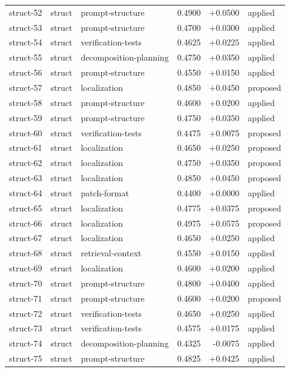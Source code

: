 \begin{center}
\begin{longtable}{llp{5.2cm}rrl}
struct-52 & struct & prompt-structure & 0.4900 & +0.0500 & applied \\
struct-53 & struct & prompt-structure & 0.4700 & +0.0300 & applied \\
struct-54 & struct & verification-tests & 0.4625 & +0.0225 & applied \\
struct-55 & struct & decomposition-planning & 0.4750 & +0.0350 & applied \\
struct-56 & struct & prompt-structure & 0.4550 & +0.0150 & applied \\
struct-57 & struct & localization & 0.4850 & +0.0450 & proposed \\
struct-58 & struct & prompt-structure & 0.4600 & +0.0200 & applied \\
struct-59 & struct & prompt-structure & 0.4750 & +0.0350 & applied \\
struct-60 & struct & verification-tests & 0.4475 & +0.0075 & proposed \\
struct-61 & struct & localization & 0.4650 & +0.0250 & proposed \\
struct-62 & struct & localization & 0.4750 & +0.0350 & proposed \\
struct-63 & struct & localization & 0.4850 & +0.0450 & proposed \\
struct-64 & struct & patch-format & 0.4400 & +0.0000 & applied \\
struct-65 & struct & localization & 0.4775 & +0.0375 & proposed \\
struct-66 & struct & localization & 0.4975 & +0.0575 & proposed \\
struct-67 & struct & localization & 0.4650 & +0.0250 & applied \\
struct-68 & struct & retrieval-context & 0.4550 & +0.0150 & applied \\
struct-69 & struct & localization & 0.4600 & +0.0200 & applied \\
struct-70 & struct & prompt-structure & 0.4800 & +0.0400 & applied \\
struct-71 & struct & prompt-structure & 0.4600 & +0.0200 & proposed \\
struct-72 & struct & verification-tests & 0.4650 & +0.0250 & applied \\
struct-73 & struct & verification-tests & 0.4575 & +0.0175 & applied \\
struct-74 & struct & decomposition-planning & 0.4325 & -0.0075 & applied \\
struct-75 & struct & prompt-structure & 0.4825 & +0.0425 & applied \\

\end{longtable}
\end{center}
